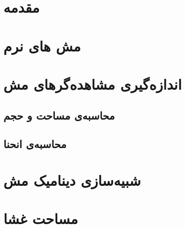 \setRL
\clearpage
\def \MemRes {\Mempath /MembraneResults}

\section{
مقدمه
}


\section{\label{sec:Soft meshes}
مش های نرم
}






\section{\label{sec:MeshObservables}
اندازه‌گیری مشاهده‌گر‌های مش
}
\subsection{\label{sec:areaVolumeCalculation}
محاسبه‌ی مساحت و حجم
}


%


\subsection{\label{sec:curvatureCalculation}
محاسبه‌ی انحنا
}


\section{\label{sec:Results DAR MD}
شبیه‌سازی دینامیک مش
}










%


\section{\label{sec:resultsArea}
مساحت غشا
}




